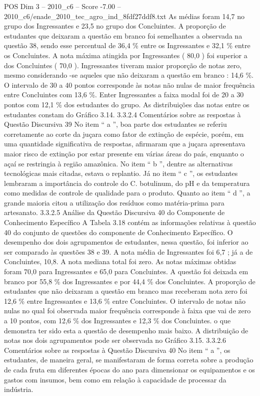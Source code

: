 \begin{textsample}{POS Dim 3 – 2010\_c6 – Score -7.00 – 2010\_c6/enade\_2010\_tec\_agro\_ind\_8fdf27ddf8.txt}
As médias foram 14,7 no grupo dos Ingressantes e 23,5 no grupo dos Concluintes.
A proporção de estudantes que deixaram a questão em branco foi semelhantes a observada na questão 38, sendo esse percentual de 36,4 \% entre os Ingressantes e 32,1 \% entre os Concluintes.
A nota máxima atingida por Ingressantes ( 80,0 ) foi superior a dos Concluintes ( 70,0 ).
Ingressantes tiveram maior proporção de notas zero, mesmo considerando -se aqueles que não deixaram a questão em branco : 14,6 \%.
O intervalo de 30 a 40 pontos corresponde às notas não nulas de maior frequência entre Concluintes com 13,6 \%.
Enter Ingressantes a faixa modal foi de 20 a 30 pontos com 12,1 \% dos estudantes do grupo.
As distribuições das notas entre os estudantes constam do Gráfico 3.14. 3.3.2.4 Comentários sobre as respostas à Questão Discursiva 39 No item “ a ”, boa parte dos estudantes se referiu corretamente ao corte da juçara como fator de extinção de espécie, porém, em uma quantidade significativa de respostas, afirmaram que a juçara apresentava maior risco de extinção por estar presente em várias áreas do país, enquanto o açaí se restringia à região amazônica.
No item “ b ”, dentre as alternativas tecnológicas mais citadas, estava o replantio.
Já no item “ c ”, os estudantes lembraram a importância do controle do C. botulinum, do pH e da temperatura como medidas de controle de qualidade para o produto.
Quanto ao item “ d ”, a grande maioria citou a utilização dos resíduos como matéria-prima para artesanato. 3.3.2.5 Análise da Questão Discursiva 40 do Componente de Conhecimento Específico A Tabela 3.18 contém as informações relativas à questão 40 do conjunto de questões do componente de Conhecimento Específico.
O desempenho dos dois agrupamentos de estudantes, nessa questão, foi inferior ao ser comparado às questões 38 e 39.
A nota média de Ingressantes foi 6,7 ; já a de Concluintes, 10,8.
A nota mediana total foi zero.
As notas máximas obtidas foram 70,0 para Ingressantes e 65,0 para Concluintes.
A questão foi deixada em branco por 55,8 \% dos Ingressantes e por 44,4 \% dos Concluintes.
A proporção de estudantes que não deixaram a questão em branco mas receberam nota zero foi 12,6 \% entre Ingressantes e 13,6 \% entre Concluintes.
O intervalo de notas não nulas no qual foi observada maior frequência corresponde à faixa que vai de zero a 10 pontos, com 12,6 \% dos Ingressantes e 12,3 \% dos Concluintes. o que demonstra ter sido esta a questão de desempenho mais baixo.
A distribuição de notas nos dois agrupamentos pode ser observada no Gráfico 3.15. 3.3.2.6 Comentários sobre as respostas à Questão Discursiva 40 No item “ a ”, os estudantes, de maneira geral, se manifestaram de forma correta sobre a produção de cada fruta em diferentes épocas do ano para dimensionar os equipamentos e os gastos com insumos, bem como em relação à capacidade de processar da indústria.

\end{textsample}
